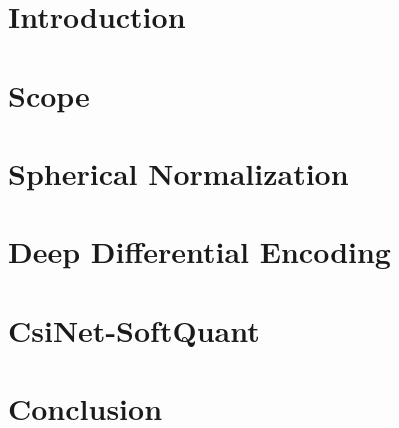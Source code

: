\documentclass[12pt]{report}
\title{}
\author{
	\authorName\\
	\authorDepartment\\
	\authorAddress \\ %
	\authorEmail \\
}
\date{\today}
\begin{document}
	


\newpage
\tableofcontents

\newpage

\chapter{Introduction}


\chapter{Scope}
\label{chap:scope}


\chapter{Spherical Normalization}
\label{chap:sph_norm}


\chapter{Deep Differential Encoding}
\label{chap:markovnet}


\chapter{CsiNet-SoftQuant}
\label{chap:csinet_quant}


\chapter{Conclusion}


\newpage
\small


\end{document}
